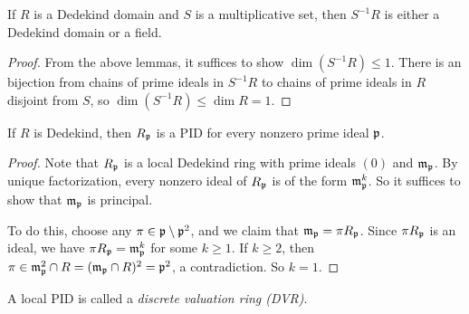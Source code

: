 \begin{prop}
  If $R$ is a Dedekind domain and $S$ is a multiplicative
  set, then $S^{-1} R$ is either a Dedekind domain or a field.
\end{prop}

\begin{proof}
  From the above lemmas, it suffices to show
  $\dim(S^{-1} R) \le 1$. There is an bijection from
  chains of prime ideals in $S^{-1} R$ to
  chains of prime ideals in $R$ disjoint from $S$, so
  $\dim(S^{-1} R) \le \dim R = 1$.
\end{proof}

\begin{corollary}\label{cor:local-pid}
  If $R$ is Dedekind, then $R_{\mathfrak{p}}$ is a PID
  for every nonzero prime ideal $\mathfrak{p}$.
\end{corollary}

\begin{proof}
  Note that $R_{\mathfrak{p}}$ is a local Dedekind ring with
  prime ideals $(0)$ and $\mathfrak{m}_{\mathfrak{p}}$. By unique
  factorization, every nonzero ideal of $R_{\mathfrak{p}}$ is
  of the form $\mathfrak{m}_{\mathfrak{p}}^k$. So it suffices to show that
  $\mathfrak{m}_{\mathfrak{p}}$ is principal.

  To do this, choose any $\pi \in \mathfrak{p} \setminus \mathfrak{p}^2$,
  and we claim that $\mathfrak{m}_{\mathfrak{p}} = \pi R_{\mathfrak{p}}$.
  Since $\pi R_{\mathfrak{p}}$ is an ideal, we have
  $\pi R_{\mathfrak{p}} = \mathfrak{m}_{\mathfrak{p}}^k$ for some $k \ge 1$.
  If $k \ge 2$, then $\pi \in \mathfrak{m}_{\mathfrak{p}}^2 \cap R = (\mathfrak{m}_{\mathfrak{p}} \cap R)^2 = \mathfrak{p}^2$,
  a contradiction. So $k = 1$.
\end{proof}

\begin{definition}
  A local PID is called a \emph{discrete valuation ring (DVR)}.
\end{definition}

